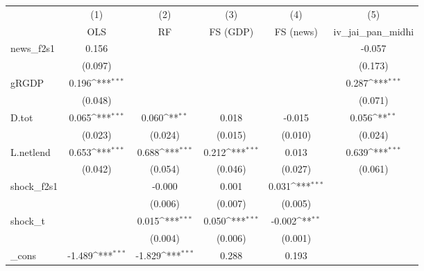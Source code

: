 {
\def\sym#1{\ifmmode^{#1}\else\(^{#1}\)\fi}
\begin{tabular}{l*{5}{c}}
\toprule
            &\multicolumn{1}{c}{(1)}&\multicolumn{1}{c}{(2)}&\multicolumn{1}{c}{(3)}&\multicolumn{1}{c}{(4)}&\multicolumn{1}{c}{(5)}\\
            &\multicolumn{1}{c}{OLS}&\multicolumn{1}{c}{RF}&\multicolumn{1}{c}{FS (GDP)}&\multicolumn{1}{c}{FS (news)}&\multicolumn{1}{c}{iv\_jai\_pan\_midhi}\\
\midrule
news\_f2s1   &       0.156         &                     &                     &                     &      -0.057         \\
            &     (0.097)         &                     &                     &                     &     (0.173)         \\
\addlinespace
gRGDP       &       0.196\sym{***}&                     &                     &                     &       0.287\sym{***}\\
            &     (0.048)         &                     &                     &                     &     (0.071)         \\
\addlinespace
D.tot       &       0.065\sym{***}&       0.060\sym{**} &       0.018         &      -0.015         &       0.056\sym{**} \\
            &     (0.023)         &     (0.024)         &     (0.015)         &     (0.010)         &     (0.024)         \\
\addlinespace
L.netlend   &       0.653\sym{***}&       0.688\sym{***}&       0.212\sym{***}&       0.013         &       0.639\sym{***}\\
            &     (0.042)         &     (0.054)         &     (0.046)         &     (0.027)         &     (0.061)         \\
\addlinespace
shock\_f2s1  &                     &      -0.000         &       0.001         &       0.031\sym{***}&                     \\
            &                     &     (0.006)         &     (0.007)         &     (0.005)         &                     \\
\addlinespace
shock\_t     &                     &       0.015\sym{***}&       0.050\sym{***}&      -0.002\sym{**} &                     \\
            &                     &     (0.004)         &     (0.006)         &     (0.001)         &                     \\
\addlinespace
\_cons      &      -1.489\sym{***}&      -1.829\sym{***}&       0.288         &       0.193         &                     \\

\end{tabular}}
